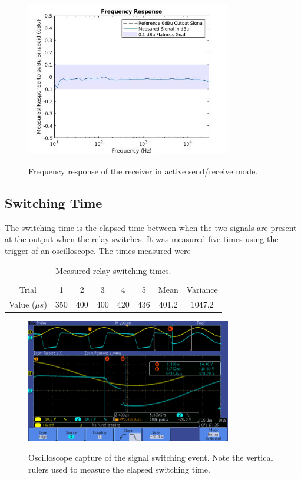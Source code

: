 \documentclass{article}
\begin{document}
	\begin{figure}
		\centering
		\includegraphics[width = 0.8\textwidth]{PR4Images/FRactive.jpg}\
		\caption{Frequency response of the receiver in active send/receive mode.}
		\label{fig:FRplot}
	\end{figure}

	\subsection{Switching Time}
	The switching time is the elapsed time between when the two signals are present at the output when the relay switches.  It was measured five times using the trigger of an oscilloscope.  The times measured were
	\begin{table}[H]
	\begin{center}
	\begin{tabular}{|c|c c c c c|c c|}
	\hline
	Trial & 1 & 2 & 3 & 4 & 5 & Mean & Variance \\
	Value ($\mu s$) & 350 & 400 & 400 & 420 & 436 & 401.2 & 1047.2 \\ 
	\hline
	\end{tabular}
	\caption{Measured relay switching times.}
	\end{center}
	\end{table}

	\begin{figure}
		\centering
		\includegraphics[width = 0.8\textwidth]{tekmeasurements/tek0004.png}\
		\caption{Oscilloscope capture of the signal switching event.  Note the vertical rulers used to measure the elapsed switching time.}
		\label{fig:relayswitching}
	\end{figure}
\end{document}
